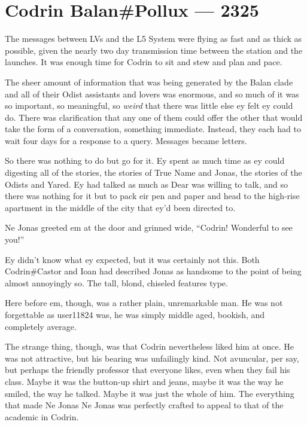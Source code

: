\hypertarget{codrin-balanpollux-2325}{%
\chapter{Codrin Balan\#Pollux — 2325}\label{codrin-balanpollux-2325}}

The messages between LVs and the L5 System were flying as fast and as thick as possible, given the nearly two day transmission time between the station and the launches. It was enough time for Codrin to sit and stew and plan and pace.

The sheer amount of information that was being generated by the Balan clade and all of their Odist assistants and lovers was enormous, and so much of it was so important, so meaningful, so \emph{weird} that there was little else ey felt ey could do. There was clarification that any one of them could offer the other that would take the form of a conversation, something immediate. Instead, they each had to wait four days for a response to a query. Messages became letters.

So there was nothing to do but go for it. Ey spent as much time as ey could digesting all of the stories, the stories of True Name and Jonas, the stories of the Odists and Yared. Ey had talked as much as Dear was willing to talk, and so there was nothing for it but to pack eir pen and paper and head to the high-rise apartment in the middle of the city that ey'd been directed to.

Ne Jonas greeted em at the door and grinned wide, ``Codrin! Wonderful to see you!''

Ey didn't know what ey expected, but it was certainly not this. Both Codrin\#Castor and Ioan had described Jonas as handsome to the point of being almost annoyingly so. The tall, blond, chiseled features type.

Here before em, though, was a rather plain, unremarkable man. He was not forgettable as user11824 was, he was simply middle aged, bookish, and completely average.

The strange thing, though, was that Codrin nevertheless liked him at once. He was not attractive, but his bearing was unfailingly kind. Not avuncular, per say, but perhaps the friendly professor that everyone likes, even when they fail his class. Maybe it was the button-up shirt and jeans, maybe it was the way he smiled, the way he talked. Maybe it was just the whole of him. The everything that made Ne Jonas Ne Jonas was perfectly crafted to appeal to that of the academic in Codrin.

